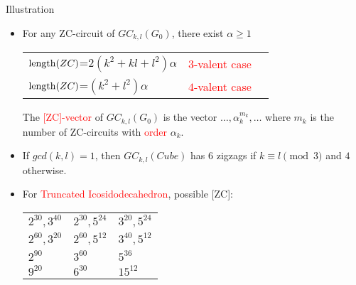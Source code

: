 \documentclass[%
pdf,
colorBG,
slideColor,
]{prosper}
\begin{document}
\begin{slide}{Illustration}
\vspace{-2mm}
\begin{itemize}
\item For any ZC-circuit of $GC_{k,l}(G_0)$, there exist $\alpha\geq 1$
\begin{tabular}{lll}
${\rm length}(ZC)$=$2(k^2+kl+l^2)\alpha$& \textcolor{red}{$3$-valent case}\\
${\rm length}(ZC)$=$(k^2+l^2)\alpha$ & \textcolor{red}{$4$-valent case}
\end{tabular}

The \textcolor{red}{[ZC]-vector} of $GC_{k,l}(G_0)$ is the vector $\dots, \alpha_k^{m_k}, \dots$ where $m_k$ is the number of ZC-circuits with \textcolor{red}{order} $\alpha_k$.
\item If $gcd(k,l)=1$, then $GC_{k,l}(Cube)$ has $6$ zigzags if $k\equiv l\pmod 3$ and $4$ otherwise.
\item For \textcolor{red}{Truncated Icosidodecahedron}, possible [ZC]:
\begin{center}
\begin{minipage}{3cm}
\begin{center}
\end{center}
\end{minipage}
\begin{minipage}{6cm}
\textcolor{red}{
\begin{tabular}{|l|l|l|}
\hline
$2^{30}, 3^{40}$&
$2^{30}, 5^{24}$&
$3^{20}, 5^{24}$\\
$2^{60}, 3^{20}$&
$2^{60}, 5^{12}$&
$3^{40}, 5^{12}$\\
$2^{90}$&
$3^{60}$&
$5^{36}$\\
$9^{20}$&
$6^{30}$&
$15^{12}$\\
\hline
\end{tabular}
}
\end{minipage}
\end{center}



\end{itemize}


\end{slide}
\end{document}
